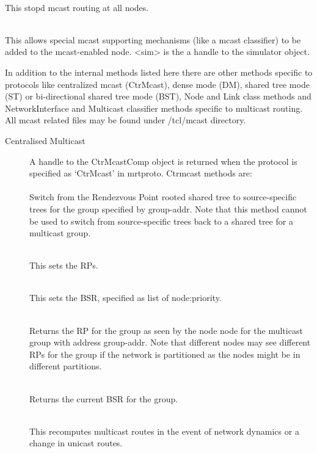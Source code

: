 \begin{flushleft}
\\
This stopd mcast routing at all nodes.


\\
This allows special mcast supporting mechanisms (like a mcast classifier) to
be added to the mcast-enabled node. <sim> is the a handle to the simulator
object.

In addition to the internal methods listed here there are other methods specific to
protocols like centralized mcast (CtrMcast), dense mode (DM), shared tree
mode (ST) or bi-directional shared tree mode (BST), Node and Link class
methods and NetworkInterface and Multicast classifier methods specific to
multicast routing. All mcast related files may be found under
\ns/tcl/mcast directory. 
\begin{description}

\item[Centralised Multicast] A handle to the CtrMcastComp object is
returned when the protocol is specified as `CtrMcast' in mrtproto. 
Ctrmcast methods are: \\

\\
Switch from the Rendezvous Point rooted shared tree to source-specific
trees for the group specified by group-addr. Note that this method cannot
be used to switch from source-specific trees back to a shared tree for a
multicast group. 

\\
This sets the RPs.

\\
This sets the BSR, specified as list of node:priority.

\\
Returns the RP for the group as seen by the node node for the multicast
group with address group-addr. Note that different nodes may see different
RPs for the group if the network is partitioned as the nodes might be in
different partitions. 

\\
Returns the current BSR for the group.

\\
This recomputes multicast routes in the event of network dynamics or a
change in unicast routes.



\end{description}
\end{flushleft}
